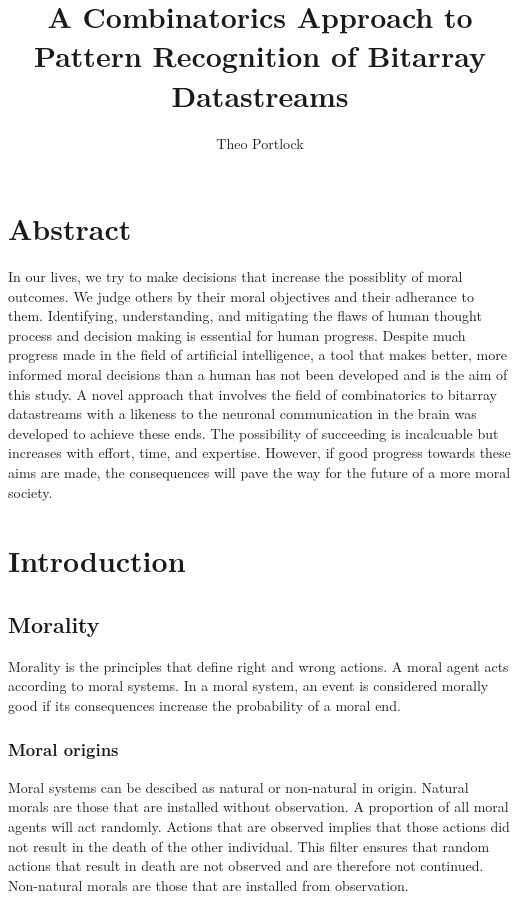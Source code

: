 \documentclass{book}
\title{A Combinatorics Approach to Pattern Recognition of Bitarray Datastreams}
\author{Theo Portlock}
\begin{document}
\frontmatter
\maketitle

\chapter{Abstract}
In our lives, we try to make decisions that increase the possiblity of moral outcomes.
We judge others by their moral objectives and their adherance to them.
Identifying, understanding, and mitigating the flaws of human thought process and decision making is essential for human progress.
Despite much progress made in the field of artificial intelligence, a tool that makes better, more informed moral decisions than a human has not been developed and is the aim of this study.
A novel approach that involves the field of combinatorics to bitarray datastreams with a likeness to the neuronal communication in the brain was developed to achieve these ends.
The possibility of succeeding is incalcuable but increases with effort, time, and expertise.
However, if good progress towards these aims are made, the consequences will pave the way for the future of a more moral society.

\cleardoublepage
{}
{}
\tableofcontents

\cleardoublepage
{}
{}
\listoffigures

\cleardoublepage
{}
{}
\listoftables

\mainmatter
\chapter{Introduction}
\section{Morality}
Morality is the principles that define right and wrong actions.
A moral agent acts according to moral systems.
In a moral system, an event is considered morally good if its consequences increase the probability of a moral end.

\subsection{Moral origins}
Moral systems can be descibed as natural or non-natural in origin.
Natural morals are those that are installed without observation.
A proportion of all moral agents will act randomly.
Actions that are observed implies that those actions did not result in the death of the other individual.
This filter ensures that random actions that result in death are not observed and are therefore not continued.
Non-natural morals are those that are installed from observation.
\end{document}
